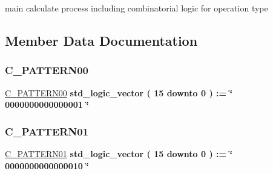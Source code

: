 main calculate process including combinatorial logic for operation type 

\subsection{Member Data Documentation}
\mbox{\label{classalu_1_1rtl_a83d996bd260cfb3b49ca3b3f46bf0d32}} 
\subsubsection{\texorpdfstring{C\+\_\+\+P\+A\+T\+T\+E\+R\+N00}{C\_PATTERN00}}
{\footnotesize\ttfamily \hyperlink{classalu_1_1rtl_a83d996bd260cfb3b49ca3b3f46bf0d32}{C\+\_\+\+P\+A\+T\+T\+E\+R\+N00} {\bfseries \textcolor{comment}{std\+\_\+logic\+\_\+vector}\textcolor{vhdlchar}{ }\textcolor{vhdlchar}{(}\textcolor{vhdlchar}{ }\textcolor{vhdlchar}{ } \textcolor{vhdldigit}{15} \textcolor{vhdlchar}{ }\textcolor{keywordflow}{downto}\textcolor{vhdlchar}{ }\textcolor{vhdlchar}{ } \textcolor{vhdldigit}{0} \textcolor{vhdlchar}{ }\textcolor{vhdlchar}{)}\textcolor{vhdlchar}{ }\textcolor{vhdlchar}{ }\textcolor{vhdlchar}{ }\textcolor{vhdlchar}{\+:}\textcolor{vhdlchar}{=}\textcolor{vhdlchar}{ }\textcolor{vhdlchar}{ }\textcolor{vhdlchar}{ }\textcolor{vhdlchar}{ }\textcolor{keyword}{\char`\"{} 0000000000000001 \char`\"{}}\textcolor{vhdlchar}{ }} \hspace{0.3cm}{\ttfamily [Constant]}}

\mbox{\label{classalu_1_1rtl_a1864e98eb4788deffa99dbdc9bfb6dc7}} 
\subsubsection{\texorpdfstring{C\+\_\+\+P\+A\+T\+T\+E\+R\+N01}{C\_PATTERN01}}
{\footnotesize\ttfamily \hyperlink{classalu_1_1rtl_a1864e98eb4788deffa99dbdc9bfb6dc7}{C\+\_\+\+P\+A\+T\+T\+E\+R\+N01} {\bfseries \textcolor{comment}{std\+\_\+logic\+\_\+vector}\textcolor{vhdlchar}{ }\textcolor{vhdlchar}{(}\textcolor{vhdlchar}{ }\textcolor{vhdlchar}{ } \textcolor{vhdldigit}{15} \textcolor{vhdlchar}{ }\textcolor{keywordflow}{downto}\textcolor{vhdlchar}{ }\textcolor{vhdlchar}{ } \textcolor{vhdldigit}{0} \textcolor{vhdlchar}{ }\textcolor{vhdlchar}{)}\textcolor{vhdlchar}{ }\textcolor{vhdlchar}{ }\textcolor{vhdlchar}{ }\textcolor{vhdlchar}{\+:}\textcolor{vhdlchar}{=}\textcolor{vhdlchar}{ }\textcolor{vhdlchar}{ }\textcolor{vhdlchar}{ }\textcolor{vhdlchar}{ }\textcolor{keyword}{\char`\"{} 0000000000000010 \char`\"{}}\textcolor{vhdlchar}{ }} \hspace{0.3cm}{\ttfamily [Constant]}}

